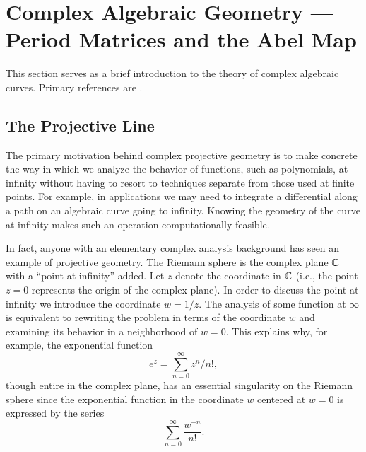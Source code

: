 \section{Complex Algebraic Geometry --- Period Matrices and the Abel Map}

This section serves as a brief introduction to the theory of complex
algebraic curves. Primary references are \cite{Ueno97,Griffiths89}.

\subsection{The Projective Line}

The primary motivation behind complex projective geometry is to make concrete
the way in which we analyze the behavior of functions, such as
polynomials, at infinity without having to resort to techniques separate
from those used at finite points. For example, in applications we may
need to integrate a differential along a path on an algebraic curve
going to infinity. Knowing the geometry of the curve at infinity makes
such an operation computationally feasible.

In fact, anyone with an elementary complex analysis background has seen
an example of projective geometry. The Riemann sphere is the complex
plane $\operatorname{\mathbb{C}}$ with a ``point at infinity'' added. Let $z$ denote the
coordinate in $\operatorname{\mathbb{C}}$ (i.e., the point $z=0$ represents the origin of the
complex plane). In order to discuss the point at infinity we introduce
the coordinate $w = 1/z$. The analysis of some function at $\infty$ is
equivalent to rewriting the problem in terms of the coordinate $w$ and
examining its behavior in a neighborhood of $w=0$. This explains why,
for example, the exponential function
\[
    e^z = \sum_{n=0}^\infty z^n / n!,
\]
though entire in the complex plane, has an essential singularity on the
Riemann sphere since the exponential function in the coordinate $w$
centered at $w=0$ is expressed by the series
\[
    \sum_{n=0}^\infty \frac{w^{-n}}{n!}.
\]

